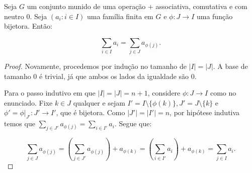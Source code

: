 \begin{prop}
    Seja $G$ um conjunto munido de uma operação $+$ associativa, comutativa e com neutro $0$. Seja $(a_i: i \in I)$ uma família finita em $G$ e $\phi:J\rightarrow I$ uma função bijetora. Então:

    $$\sum_{i \in I}a_i=\sum_{j \in J}a_{\phi(j)}.$$

\end{prop}
\begin{proof}
Novamente, procedemos por indução no tamanho de $|I|=|J|$. A base de tamanho $0$ é trivial, já que ambos os lados da igualdade são $0$.

Para o passo indutivo em que $|I|=|J|=n+1$, considere $\phi:J\rightarrow I$ como no enunciado. Fixe $k \in J$ qualquer e sejam $I'=I\setminus\{\phi(k)\}, J'=J\setminus\{k\}$ e $\phi'=\phi|_{J'}:J'\rightarrow I'$, que é bijetora. Como $|J'|=|I'|=n$, por hipótese indutiva temos que $\sum_{j \in J'}a_{\phi(j)}=\sum_{i \in I'}a_i$. Segue que:

$$\sum_{j \in J}a_{\phi(j)}=\left(\sum_{j \in J'}a_{\phi(j)}\right)+a_{\phi(k)}=\left(\sum_{i \in I'}a_{i}\right)+a_{\phi(k)}=\sum_{j \in I}a_{i}.$$
\end{proof}
